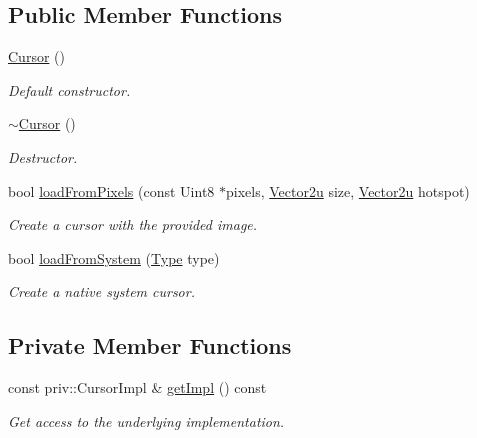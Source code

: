 \subsection*{Public Member Functions}
\begin{DoxyCompactItemize}
\item 
\mbox{\hyperlink{classsf_1_1_cursor_a6a36a0a5943b22b77b00cac839dd715c}{Cursor}} ()
\begin{DoxyCompactList}\small\item\em Default constructor. \end{DoxyCompactList}\item 
\mbox{\hyperlink{classsf_1_1_cursor_a777ba6a1d0d68f8eb9dc85976a5b9727}{$\sim$\+Cursor}} ()
\begin{DoxyCompactList}\small\item\em Destructor. \end{DoxyCompactList}\item 
bool \mbox{\hyperlink{classsf_1_1_cursor_ac24ecf82ac7d9ba6703389397f948b3a}{load\+From\+Pixels}} (const Uint8 $\ast$pixels, \mbox{\hyperlink{classsf_1_1_vector2}{Vector2u}} size, \mbox{\hyperlink{classsf_1_1_vector2}{Vector2u}} hotspot)
\begin{DoxyCompactList}\small\item\em Create a cursor with the provided image. \end{DoxyCompactList}\item 
bool \mbox{\hyperlink{classsf_1_1_cursor_ad41999c8633c2fbaa2364e379c1ab25b}{load\+From\+System}} (\mbox{\hyperlink{classsf_1_1_cursor_ab9ab152aec1f8a4955e34ccae08f930a}{Type}} type)
\begin{DoxyCompactList}\small\item\em Create a native system cursor. \end{DoxyCompactList}\end{DoxyCompactItemize}
\subsection*{Private Member Functions}
\begin{DoxyCompactItemize}
\item 
const priv\+::\+Cursor\+Impl \& \mbox{\hyperlink{classsf_1_1_cursor_aa4795e3565ac3aabd4b078ededaede4d}{get\+Impl}} () const
\begin{DoxyCompactList}\small\item\em Get access to the underlying implementation. \end{DoxyCompactList}\end{DoxyCompactItemize}
